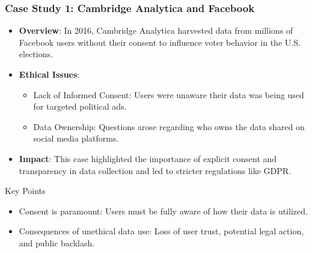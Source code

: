 \documentclass[aspectratio=169]{beamer}
\begin{document}
\begin{frame}[fragile]
  \frametitle{Case Study 1: Cambridge Analytica and Facebook}
  \begin{itemize}
    \item \textbf{Overview}: In 2016, Cambridge Analytica harvested data from millions of Facebook users without their consent to influence voter behavior in the U.S. elections.
    \item \textbf{Ethical Issues}:
      \begin{itemize}
        \item Lack of Informed Consent: Users were unaware their data was being used for targeted political ads.
        \item Data Ownership: Questions arose regarding who owns the data shared on social media platforms.
      \end{itemize}
    \item \textbf{Impact}: This case highlighted the importance of explicit consent and transparency in data collection and led to stricter regulations like GDPR.
  \end{itemize}

  \begin{block}{Key Points}
    \begin{itemize}
      \item Consent is paramount: Users must be fully aware of how their data is utilized.
      \item Consequences of unethical data use: Loss of user trust, potential legal action, and public backlash.
    \end{itemize}
  \end{block}
\end{frame}
\end{document}
